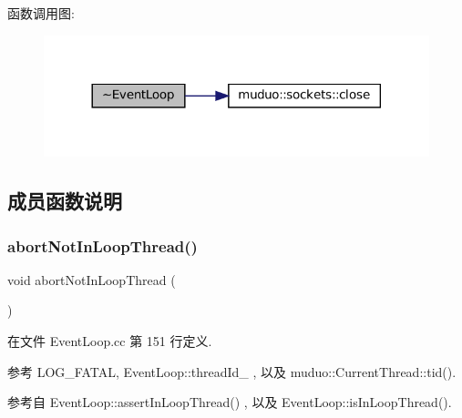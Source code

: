 函数调用图\+:
\nopagebreak
\begin{figure}[H]
\begin{center}
\leavevmode
\includegraphics[width=317pt]{classmuduo_1_1EventLoop_ad39d140230e71b90198d0ed03e0c21f2_cgraph}
\end{center}
\end{figure}


\subsection{成员函数说明}
\mbox{\label{classmuduo_1_1EventLoop_a6375a5e33170fe1ee0fcb82c68b684ba}} 
\subsubsection{\texorpdfstring{abort\+Not\+In\+Loop\+Thread()}{abortNotInLoopThread()}}
{\footnotesize\ttfamily void abort\+Not\+In\+Loop\+Thread (\begin{DoxyParamCaption}{ }\end{DoxyParamCaption})\hspace{0.3cm}{\ttfamily [private]}}



在文件 Event\+Loop.\+cc 第 151 行定义.



参考 L\+O\+G\+\_\+\+F\+A\+T\+AL, Event\+Loop\+::thread\+Id\+\_\+ , 以及 muduo\+::\+Current\+Thread\+::tid().



参考自 Event\+Loop\+::assert\+In\+Loop\+Thread() , 以及 Event\+Loop\+::is\+In\+Loop\+Thread().


